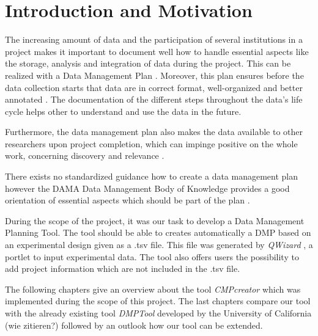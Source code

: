 
\section{Introduction and Motivation}
The increasing amount of data and the participation of several institutions in a project makes it important to document well how to handle essential aspects like the storage, analysis and integration of data during the project. This can be realized with a Data Management Plan \cite{lecture}. Moreover, this plan ensures before the data collection starts that data are in correct format, well-organized and better annotated \cite{planWhy}. The documentation of the different steps throughout the data's life cycle helps other to understand and use the data in the future. 

Furthermore, the data management plan also makes the data available to other researchers upon project completion, which can impinge positive on the whole work, concerning discovery and relevance \cite{planWhy}.


There exists no standardized guidance how to create a data management plan however the DAMA Data Management Body of Knowledge \cite{DAMAInternational:2009:DGD:1593444} provides a good orientation of essential aspects which should be part of the plan \cite{lecture}. 


During the scope of the project, it was our task to develop a Data Management Planning Tool. The tool should be able to creates automatically a DMP based on an experimental design given as a .tsv file. This file was generated by \textit{QWizard} \cite{qwizard}, a portlet to input experimental data. The tool also offers users the possibility to add project information which are not included in the .tsv file.


The following chapters give an overview about the tool \textit{CMPcreator} which was implemented during the scope of this project. The last chapters compare our tool with the  already existing tool \textit{DMPTool} developed by the University of California (wie zitieren?) followed by an outlook how our tool can be extended.



%
%
%
